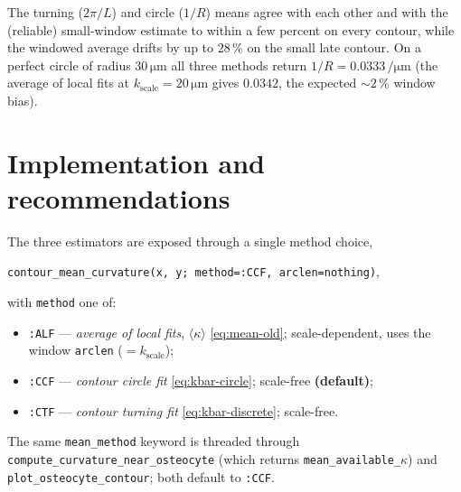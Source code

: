 \documentclass[11pt]{article}
\newcommand{\um}{\si{\micro\meter}}
\newcommand{\uminv}{\si{\per\micro\meter}}
\newcommand{\code}[1]{\texttt{#1}}
\begin{document}
The turning ($2\pi/L$) and circle ($1/R$) means agree with each other and with
the (reliable) small-window estimate to within a few percent on every contour,
while the windowed average drifts by up to $28\,\%$ on the small late contour. On
a perfect circle of radius $30\,\um$ all three methods return
$1/R = 0.0333\,\uminv$ (the average of local fits at $k_{\text{scale}}=20\,\um$
gives $0.0342$, the expected $\sim$$2\,\%$ window bias).

\section{Implementation and recommendations}
\label{sec:reco}

The three estimators are exposed through a single method choice,
\begin{center}
  \code{contour\_mean\_curvature(x, y; method=:CCF, arclen=nothing)},
\end{center}
with \code{method} one of:
\begin{itemize}
  \item \code{:ALF} --- \emph{average of local fits}, $\langle\kappa\rangle$
    \eqref{eq:mean-old}; scale-dependent, uses the window \code{arclen}
    ($=k_{\text{scale}}$);
  \item \code{:CCF} --- \emph{contour circle fit} \eqref{eq:kbar-circle};
    scale-free \textbf{(default)};
  \item \code{:CTF} --- \emph{contour turning fit} \eqref{eq:kbar-discrete};
    scale-free.
\end{itemize}
The same \code{mean\_method} keyword is threaded through
\code{compute\_curvature\_near\_osteocyte} (which returns
\code{mean\_available\_$\kappa$}) and \code{plot\_osteocyte\_contour}; both
default to \code{:CCF}.
\end{document}
